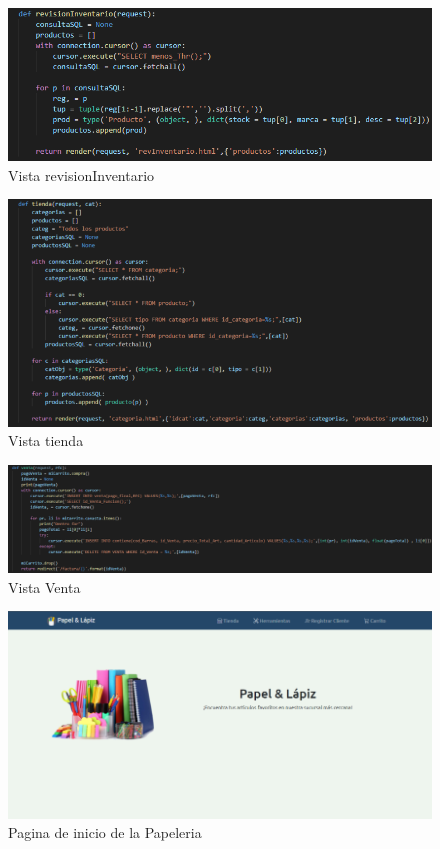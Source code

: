 \documentclass[12pt,letterpaper]{article}
\begin{document}
	\begin{figure}[H]
		\centering
		\includegraphics[scale=0.50]{Documentacion/img/def_revisionInventario.png}
		\caption{Vista revisionInventario}
	\end{figure}
	
	\begin{figure}[H]
		\centering
		\includegraphics[scale=0.70]{Documentacion/img/def_tienda.png}
		\caption{Vista tienda}
	\end{figure}
	
	\begin{figure}[H]
		\centering
		\includegraphics[scale=0.50]{Documentacion/img/def_Venta.png}
		\caption{Vista Venta}
	\end{figure}
	
	
	\begin{figure}[H]
		\centering
		\includegraphics[scale=0.50]{Documentacion/img/vistaPape.png}
		\caption{Pagina de inicio de la Papeleria}
	\end{figure}
	
\end{document}
